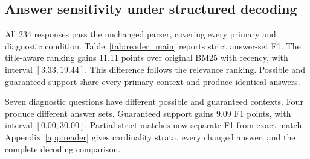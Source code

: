 \subsection{Answer sensitivity under structured decoding}
All 234 responses pass the unchanged parser, covering every primary and diagnostic condition.
Table~\ref{tab:reader_main} reports strict answer-set F1.
The title-aware ranking gains 11.11 points over original BM25 with recency, with interval $[3.33,19.44]$.
This difference follows the relevance ranking.
Possible and guaranteed support share every primary context and produce identical answers.


Seven diagnostic questions have different possible and guaranteed contexts.
Four produce different answer sets.
Guaranteed support gains 9.09 F1 points, with interval $[0.00,30.00]$.
Partial strict matches now separate F1 from exact match.
Appendix~\ref{app:reader} gives cardinality strata, every changed answer, and the complete decoding comparison.
